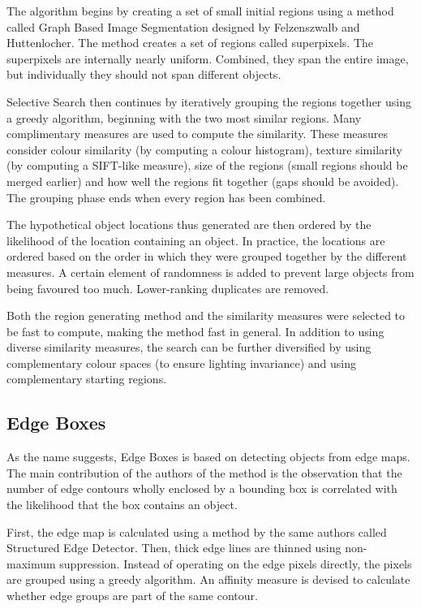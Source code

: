The algorithm begins by creating a set of small initial regions using a method called Graph Based Image Segmentation designed by Felzenszwalb and Huttenlocher. The method creates a set of regions called superpixels. The superpixels are internally nearly uniform. Combined, they span the entire image, but individually they should not span different objects. 

Selective Search then continues by iteratively grouping the regions together using a greedy algorithm, beginning with the two most similar regions. Many complimentary measures are used to compute the similarity. These measures consider colour similarity (by computing a colour histogram), texture similarity (by computing a SIFT-like measure), size of the regions (small regions should be merged earlier) and how well the regions fit together (gaps should be avoided). The grouping phase ends when every region has been combined.

The hypothetical object locations thus generated are then ordered by the likelihood of the location containing an object. In practice, the locations are ordered based on the order in which they were grouped together by the different measures. A certain element of randomness is added to prevent large objects from being favoured too much. Lower-ranking duplicates are removed. 

Both the region generating method and the similarity measures were selected to be fast to compute, making the method fast in general. In addition to using diverse similarity measures, the search can be further diversified by using complementary colour spaces (to ensure lighting invariance) and using complementary starting regions.

\subsection{Edge Boxes}
As the name suggests, Edge Boxes is based on detecting objects from edge maps. The main contribution of the authors of the method is the observation that the number of edge contours wholly enclosed by a bounding box is correlated with the likelihood that the box contains an object.

First, the edge map is calculated using a method by the same authors called Structured Edge Detector. Then, thick edge lines are thinned using non-maximum suppression. Instead of operating on the edge pixels directly, the pixels are grouped using a greedy algorithm. An affinity measure is devised to calculate whether edge groups are part of the same contour.

